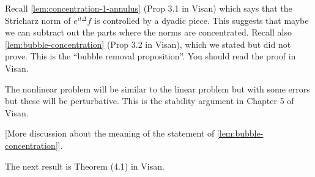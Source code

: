 \documentclass{article}
\begin{document}
Recall \cref{lem:concentration-1-annulus} (Prop 3.1 in Visan) which says that
the Stricharz norm of $e^{it\Delta}f$ is controlled by a dyadic piece. This
suggests that maybe we can subtract out the parts where the norms are
concentrated. Recall also \cref{lem:bubble-concentration} (Prop 3.2 in Visan),
which we stated but did not prove. This is the ``bubble removal proposition''. You should read the proof in Visan.

The nonlinear problem will be similar to the linear problem but with some errors
but these will be perturbative. This is the stability argument in Chapter 5 of
Visan.

[More discussion about the meaning of the statement of
\cref{lem:bubble-concentration}].

The next result is Theorem (4.1) in Visan.
\end{document}
